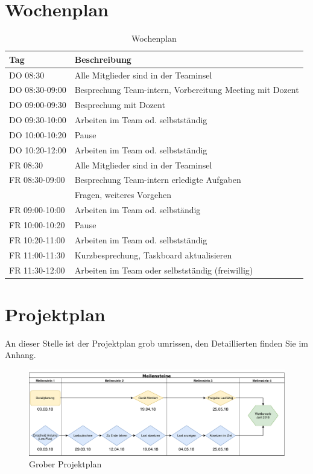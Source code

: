 \documentclass[a4paper]{report}
\begin{document}
\section{Wochenplan}
\label{sec:Wochenplan}
\begin{table}[h!]
	\begin{tabular}{|p{}|p{}|}
		\hline
		\textbf{Tag} & \textbf{Beschreibung} \\
		\hline
		DO 08:30 & Alle Mitglieder sind in der Teaminsel \\
		\hline
		DO 08:30-09:00 & Besprechung Team-intern, Vorbereitung Meeting mit Dozent \\
		\hline
		DO 09:00-09:30& Besprechung mit Dozent \\
		\hline
		DO 09:30-10:00 & Arbeiten im Team od. selbstständig \\
		\hline
		DO 10:00-10:20 & Pause \\
		\hline
		DO 10:20-12:00 & Arbeiten im Team od. selbstständig \\
		\hline
		FR 08:30 & Alle Mitglieder sind in der Teaminsel \\
		\hline
		FR 08:30-09:00 & Besprechung Team-intern erledigte Aufgaben \\
		& Fragen, weiteres Vorgehen \\
		\hline
		FR 09:00-10:00 & Arbeiten im Team od. selbständig \\
		\hline
		FR 10:00-10:20 & Pause \\
		\hline
		FR 10:20-11:00 & Arbeiten im Team od. selbstständig \\
		\hline
		FR 11:00-11:30 & Kurzbesprechung, Taskboard aktualisieren \\
		\hline
		FR 11:30-12:00 & Arbeiten im Team oder selbstständig (freiwillig)\\
		\hline
	\end{tabular}
	\caption{Wochenplan}
	\label{tab:Wochenplan}
\end{table}


\section{Projektplan}
\label{sec:Projektplan}
An dieser Stelle ist der Projektplan grob umrissen, den Detaillierten finden Sie im Anhang.

\begin{figure}[h!]
	\includegraphics[width=\linewidth,keepaspectratio]{Rahmenplan}
	\caption{Grober Projektplan}
	\label{fig:GrobProjekt}
\end{figure}
\end{document}

